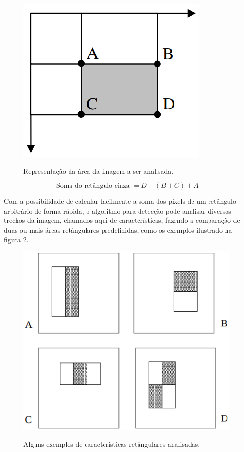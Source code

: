 \begin{figure}[htb]
    \centering
    \caption{Representação da área da imagem a ser analisada.}
    \includegraphics[scale=.4]{figs/imagem-integral-calculo.png}
    \label{fig:integral-calculo}
 \end{figure}

 \begin{equation}\label{eq:img-integral}
    \text{ Soma do retângulo cinza } = D - (B + C) + A
\end{equation}

Com a possibilidade de calcular facilmente a soma dos pixels de um retângulo arbitrário de forma rápida, o algoritmo para detecção pode analisar diversos trechos da imagem, chamados aqui de características, fazendo a comparação de duas ou mais áreas retângulares predefinidas, como os exemplos ilustrado na figura \ref{fig:features}. 

\begin{figure}[htb]
    \centering
    \caption{Alguns exemplos de características retângulares analisadas.}
    \includegraphics[scale=.5]{figs/features.png}
    \label{fig:features}
 \end{figure}

